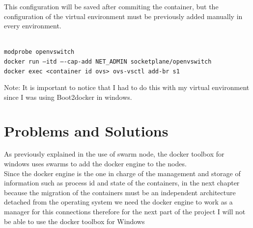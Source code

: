 This configuration will be saved after commiting the container, but the configuration of the virtual environment must be previously added manually in every environment.\\
\\

\begin{lstlisting}
modprobe openvswitch
docker run –itd –-cap-add NET_ADMIN socketplane/openvswitch
docker exec <container id ovs> ovs-vsctl add-br s1 
\end{lstlisting}

Note: It is important to notice that I had to do this with my virtual environment since I was using Boot2docker in windows.

\section{Problems and Solutions}

As previously explained in the use of swarm node, the docker toolbox for windows uses swarms to add the docker engine to the nodes.\\

Since the docker engine is the one in charge of the management and storage of information such as process id and state of the containers, in the next chapter because the migration of the containers must be an independent architecture detached from the operating system we need the docker engine to work as a manager for this connections therefore for the next part of the project I will not be able to use the docker toolbox for Windows